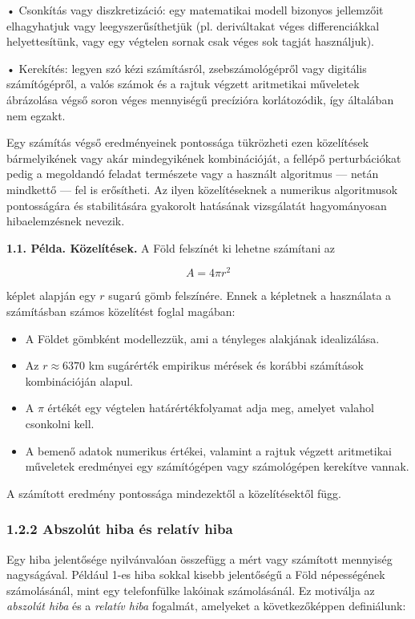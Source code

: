 \documentclass[
  magyar,
  11pt]{article}
\providecommand{\tightlist}{%
  \setlength{\itemsep}{0pt}\setlength{\parskip}{0pt}}
\begin{document}
• Csonkítás vagy diszkretizáció: egy matematikai modell bizonyos
jellemzőit elhagyhatjuk vagy leegyszerűsíthetjük (pl. deriváltakat véges
differenciákkal helyettesítünk, vagy egy végtelen sornak csak véges sok
tagját használjuk).

• Kerekítés: legyen szó kézi számításról, zsebszámológépről vagy
digitális számítógépről, a valós számok és a rajtuk végzett aritmetikai
műveletek ábrázolása végső soron véges mennyiségű precízióra
korlátozódik, így általában nem egzakt.

Egy számítás végső eredményeinek pontossága tükrözheti ezen közelítések
bármelyikének vagy akár mindegyikének kombinációját, a fellépő
perturbációkat pedig a megoldandó feladat természete vagy a használt
algoritmus --- netán mindkettő --- fel is erősítheti. Az ilyen
közelítéseknek a numerikus algoritmusok pontosságára és stabilitására
gyakorolt hatásának vizsgálatát hagyományosan hibaelemzésnek nevezik.

\textbf{1.1. Példa. Közelítések.} A Föld felszínét ki lehetne számítani
az

\[A = 4\pi r^2\]

képlet alapján egy \(r\) sugarú gömb felszínére. Ennek a képletnek a
használata a számításban számos közelítést foglal magában:

\begin{itemize}
\tightlist
\item
  A Földet gömbként modellezzük, ami a tényleges alakjának idealizálása.
\item
  Az \(r \approx 6370\) km sugárérték empirikus mérések és korábbi
  számítások kombinációján alapul.
\item
  A \(\pi\) értékét egy végtelen határértékfolyamat adja meg, amelyet
  valahol csonkolni kell.
\item
  A bemenő adatok numerikus értékei, valamint a rajtuk végzett
  aritmetikai műveletek eredményei egy számítógépen vagy számológépen
  kerekítve vannak.
\end{itemize}

A számított eredmény pontossága mindezektől a közelítésektől függ.

\subsubsection{1.2.2 Abszolút hiba és relatív
hiba}\label{abszoluxfat-hiba-uxe9s-relatuxedv-hiba}

Egy hiba jelentősége nyilvánvalóan összefügg a mért vagy számított
mennyiség nagyságával. Például 1-es hiba sokkal kisebb jelentőségű a
Föld népességének számolásánál, mint egy telefonfülke lakóinak
számolásánál. Ez motiválja az \emph{abszolút hiba} és a \emph{relatív
hiba} fogalmát, amelyeket a következőképpen definiálunk:
\end{document}
